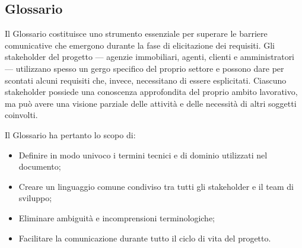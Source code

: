 \documentclass[a4paper,11pt]{article}
\begin{document}
\subsection{Glossario}

Il Glossario costituisce uno strumento essenziale per superare le barriere comunicative che emergono durante la fase di elicitazione dei requisiti. Gli stakeholder del progetto — agenzie immobiliari, agenti, clienti e amministratori — utilizzano spesso un gergo specifico del proprio settore e possono dare per scontati alcuni requisiti che, invece, necessitano di essere esplicitati. Ciascuno stakeholder possiede una conoscenza approfondita del proprio ambito lavorativo, ma può avere una visione parziale delle attività e delle necessità di altri soggetti coinvolti.

Il Glossario ha pertanto lo scopo di:
\begin{itemize}
    \item Definire in modo univoco i termini tecnici e di dominio utilizzati nel documento;
    \item Creare un linguaggio comune condiviso tra tutti gli stakeholder e il team di sviluppo;
    \item Eliminare ambiguità e incomprensioni terminologiche;
    \item Facilitare la comunicazione durante tutto il ciclo di vita del progetto.
\end{itemize}
\end{document}
